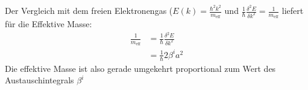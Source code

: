 Der Vergleich mit dem freien Elektronengas ($E(k) = \frac{\hbar^2 k^2}{m_{\mathrm{eff}}}$ und $\frac{1}{\hbar}\frac{\delta^2 E}{\delta k^2} = \frac{1}{m_{\mathrm{eff}}}$ liefert für die Effektive Masse:
\begin{align*}
\frac{1}{m_{\mathrm{eff}}} &= \frac{1}{\hbar}\frac{\delta^2 E}{\delta k^2} \\
 &= \frac{1}{\hbar} 2\beta^ia^2
\end{align*}
Die effektive Masse ist also gerade umgekehrt proportional zum Wert des Austauschintegrals $\beta^i$